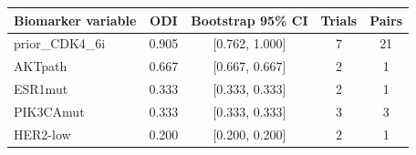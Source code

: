 \begin{tabular}{lcccc}\toprule
Biomarker variable & ODI & Bootstrap 95\% CI & Trials & Pairs \\ \midrule
prior\_CDK4\_6i & 0.905 & [0.762, 1.000] & 7 & 21 \\
AKTpath & 0.667 & [0.667, 0.667] & 2 & 1 \\
ESR1mut & 0.333 & [0.333, 0.333] & 2 & 1 \\
PIK3CAmut & 0.333 & [0.333, 0.333] & 3 & 3 \\
HER2-low & 0.200 & [0.200, 0.200] & 2 & 1 \\
\bottomrule\end{tabular}
